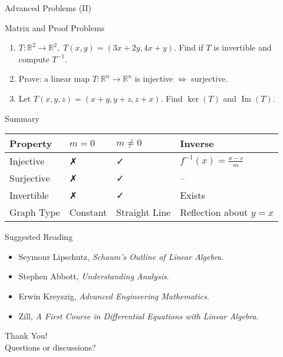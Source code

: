 \documentclass[aspectratio=169,10pt]{beamer}
\begin{document}
\begin{frame}{Advanced Problems (II)}
\begin{alertblock}{Matrix and Proof Problems}
\begin{enumerate}
    \item \(T:\mathbb{R}^2\to\mathbb{R}^2,\; T(x,y)=(3x+2y,4x+y)\). Find if \(T\) is invertible and compute \(T^{-1}\).
    \item Prove: a linear map \(T:\mathbb{R}^n\to\mathbb{R}^n\) is injective $\Leftrightarrow$ surjective.
    \item Let \(T(x,y,z)=(x+y,y+z,z+x)\). Find \(\ker(T)\) and \(\operatorname{Im}(T)\).
\end{enumerate}
\end{alertblock}
\end{frame}

\begin{frame}{Summary}
\begin{center}
\begin{tabular}{llll}
\textbf{Property} & \(m=0\) & \(m\neq0\) & \textbf{Inverse} \\
\hline
Injective & ✗ & ✓ & \(f^{-1}(x)=\frac{x-c}{m}\)\\
Surjective & ✗ & ✓ & -- \\
Invertible & ✗ & ✓ & Exists \\
Graph Type & Constant & Straight Line & Reflection about \(y=x\)
\end{tabular}
\end{center}
\end{frame}

\begin{frame}{Suggested Reading}
\begin{itemize}
    \item Seymour Lipschutz, \textit{Schaum’s Outline of Linear Algebra}.
    \item Stephen Abbott, \textit{Understanding Analysis}.
    \item Erwin Kreyszig, \textit{Advanced Engineering Mathematics}.
    \item Zill, \textit{A First Course in Differential Equations with Linear Algebra}.
\end{itemize}
\end{frame}

\begin{frame}[standout]
Thank You! \\[1em]
Questions or discussions?
\end{frame}
\end{document}
